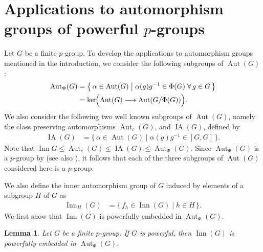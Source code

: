 \documentclass[12pt]{elsarticle}
\newtheorem{lemma}[theorem]{Lemma}
\newtheorem*{main corollary*}{Main Corollary}
\theoremstyle{definition}
\begin{document}
\section{Applications to automorphism groups of powerful $p$-groups} \label{section: General version of commutator and Frattini are powerful}
Let $G$ be a finite $p$-group. To develop the applications to automorphism groups mentioned in the introduction, we consider the following subgroups of $\operatorname{Aut}(G)$:
\begin{align*}
    \operatorname{Aut}_\Phi(G) &= \bigl\{\, \alpha \in \operatorname{Aut}(G) \;\big|\; \alpha(g)g^{-1} \in \Phi(G) \;\forall\, g \in G \,\bigr\}\\
&= \ker\!\Bigl(\operatorname{Aut}(G) \longrightarrow \operatorname{Aut}(G/\Phi(G))\Bigr).
\end{align*}
We also consider the following two well known subgroups of $\operatorname{Aut}(G)$, namely the class preserving automorphisms $\operatorname{Aut}_c(G)$, and $\operatorname{IA}(G)$, defined by 
\begin{align*}
    \operatorname{IA}(G) &= \bigl\{\, \alpha \in \operatorname{Aut}(G) \;\big|\; \alpha(g)g^{-1} \in [G, G] \,\bigr\}. 
\end{align*}
Note that $\operatorname{Inn} G \leqslant \operatorname{Aut}_c(G) \leqslant \operatorname{IA}(G)\leqslant \operatorname{Aut}_{\Phi}(G)$. Since $\operatorname{Aut}_\Phi(G)$ is a $p$-group by \cite[Proposition 3.29]{Serr2022} (see also \cite[Theorem 3.18]{Hup2025}), it follows that each of the three subgroups of $\operatorname{Aut}(G)$ considered here is a $p$-group.

We also define the inner automorphism group of $G$ induced by elements of a subgroup $H$ of $G$ as
\begin{align*}
    \operatorname{Inn}_H(G) &= \bigl\{\, f_h \in \operatorname{Inn}(G) \;\big|\; h \in H\,\bigr\}.
\end{align*}
We first show that $\operatorname{Inn}(G)$ is powerfully embedded in $\operatorname{Aut}_\Phi(G)$.
\begin{lemma} \label{InnG powerfully embedded in Aut_Phi(G)}
Let $G$ be a finite $p$-group. If $G$ is powerful, then $\operatorname{Inn}(G)$ is powerfully embedded in $\operatorname{Aut}_\Phi(G)$. 
\end{lemma}
\end{document}
